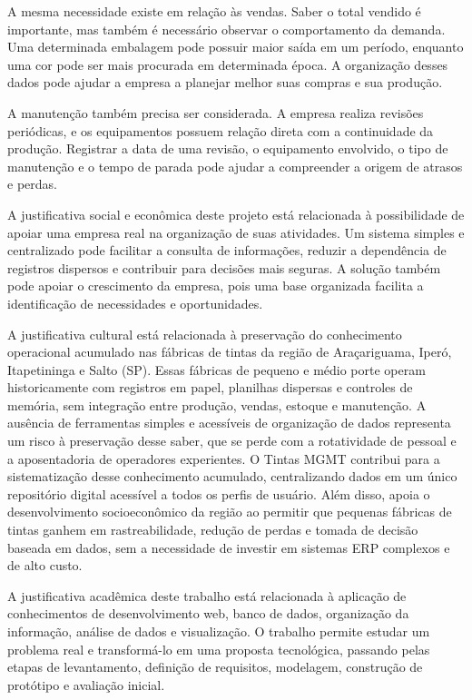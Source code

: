 \documentclass[12pt,a4paper]{article}
\begin{document}
A mesma necessidade existe em relação às vendas. Saber o total vendido é importante, mas também é necessário observar o comportamento da demanda. Uma determinada embalagem pode possuir maior saída em um período, enquanto uma cor pode ser mais procurada em determinada época. A organização desses dados pode ajudar a empresa a planejar melhor suas compras e sua produção.

A manutenção também precisa ser considerada. A empresa realiza revisões periódicas, e os equipamentos possuem relação direta com a continuidade da produção. Registrar a data de uma revisão, o equipamento envolvido, o tipo de manutenção e o tempo de parada pode ajudar a compreender a origem de atrasos e perdas.

A justificativa social e econômica deste projeto está relacionada à possibilidade de apoiar uma empresa real na organização de suas atividades. Um sistema simples e centralizado pode facilitar a consulta de informações, reduzir a dependência de registros dispersos e contribuir para decisões mais seguras. A solução também pode apoiar o crescimento da empresa, pois uma base organizada facilita a identificação de necessidades e oportunidades.

A justificativa cultural está relacionada à preservação do conhecimento operacional acumulado nas fábricas de tintas da região de Araçariguama, Iperó, Itapetininga e Salto (SP). Essas fábricas de pequeno e médio porte operam historicamente com registros em papel, planilhas dispersas e controles de memória, sem integração entre produção, vendas, estoque e manutenção. A ausência de ferramentas simples e acessíveis de organização de dados representa um risco à preservação desse saber, que se perde com a rotatividade de pessoal e a aposentadoria de operadores experientes. O Tintas MGMT contribui para a sistematização desse conhecimento acumulado, centralizando dados em um único repositório digital acessível a todos os perfis de usuário. Além disso, apoia o desenvolvimento socioeconômico da região ao permitir que pequenas fábricas de tintas ganhem em rastreabilidade, redução de perdas e tomada de decisão baseada em dados, sem a necessidade de investir em sistemas ERP complexos e de alto custo.

A justificativa acadêmica deste trabalho está relacionada à aplicação de conhecimentos de desenvolvimento web, banco de dados, organização da informação, análise de dados e visualização. O trabalho permite estudar um problema real e transformá-lo em uma proposta tecnológica, passando pelas etapas de levantamento, definição de requisitos, modelagem, construção de protótipo e avaliação inicial.
\end{document}

